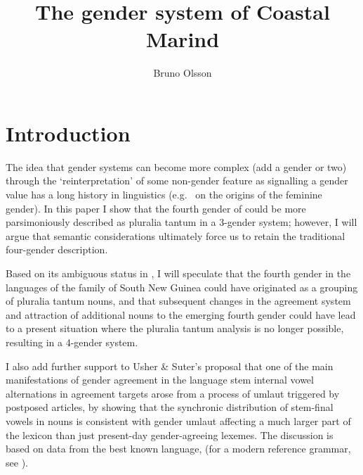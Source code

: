 \documentclass[output=collectionpaper]{langsci/langscibook}
\author{Bruno Olsson\affiliation{Australian National University}
}
\title{The gender system of Coastal Marind}
\begin{document}
\section{Introduction}
The idea that gender systems can become more complex (add a gender or two) through the `reinterpretation' of some non-gender feature as signalling a gender value has a long history in linguistics (e.g.\ \citealt{Brugmann1891} on the origins of the  feminine gender). In this paper I show that the fourth gender of  could be more parsimoniously described as pluralia tantum in a 3-gender system; however, I will argue that semantic considerations ultimately force us to retain the traditional four-gender description.

Based on its ambiguous status in , I will speculate that the fourth gender in the languages of the  family of South New Guinea could have originated as a grouping of pluralia tantum nouns, and that subsequent changes in the agreement system and attraction of additional nouns to the emerging fourth gender could have lead to a present situation where the pluralia tantum analysis is no longer possible, resulting in a 4-gender system.

I also add further support to Usher \& Suter's \parencite*{Usher2015} proposal that one of the main manifestations of gender agreement in the language \textendash{} stem internal vowel alternations in agreement targets \textendash{} arose from a process of umlaut triggered by postposed articles, by showing that the synchronic distribution of stem-final vowels in nouns is consistent with gender umlaut affecting a much larger part of the lexicon than just present-day gender-agreeing lexemes. The discussion is based on data from the best known  language,  (for a modern reference grammar, see \citealt{Olsson2017}).
\end{document}
